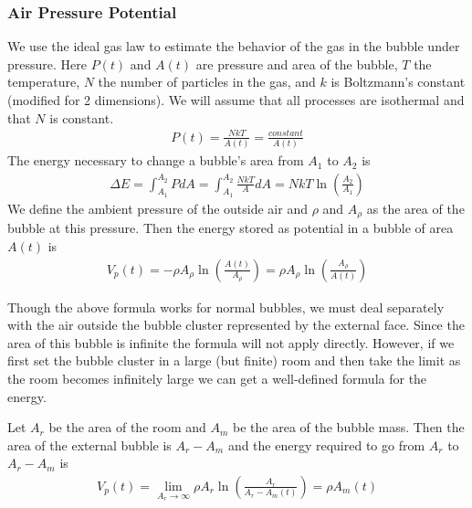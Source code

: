 \documentclass{article}
\begin{document}
\subsubsection{Air Pressure Potential}
We use the ideal gas law to estimate the
behavior of the gas in the bubble under pressure. Here $P(t)$ and $A(t)$ are
pressure and area of the bubble, $T$ the temperature, $N$ the number of particles in the
gas, and $k$ is Boltzmann's constant (modified for 2 dimensions). We will assume
that all processes are isothermal and that $N$ is constant.
\begin{align*}
P(t)=\frac{NkT}{A(t)}=\frac{constant}{A(t)}
\end{align*}
The energy necessary to change a bubble's area from $A_1$ to $A_2$ is
\begin{align*}
\Delta E = \int_{A_1}^{A_2} P dA = \int_{A_1}^{A_2} \frac{NkT}{A} dA = NkT
\ln\left(\frac{A_2}{A_1}\right)
\end{align*}
We define the ambient pressure of the outside air and $\rho$ and $A_\rho$ as
the area of the bubble at this pressure. Then the energy stored as
potential in a bubble of area $A(t)$ is
\begin{align}
V_p(t) = -\rho A_\rho \ln\left(\frac{A(t)}{A_\rho}\right) = \rho A_\rho
\ln\left(\frac{A_\rho}{A(t)}\right)
\end{align}

Though the above formula works for normal bubbles, we must deal separately with
the air outside the bubble cluster represented by the external face. Since
the area of this bubble is infinite the formula will not apply directly.
However, if we first set the bubble cluster in a large (but finite) room and
then take the limit as the room becomes infinitely large we can get a
well-defined formula for the energy. 

Let $A_r$ be the area of the room and $A_m$ be the area of the bubble mass. Then
the area of the external bubble is $A_r-A_m$ and the energy required to go from
$A_r$ to $A_r-A_m$ is
\begin{align}
V_p(t) = \lim_{A_r\to\infty} \rho A_r \ln\left(\frac{A_r}{A_r-A_m(t)}\right)=
\rho A_m(t)
\end{align}
\end{document}
